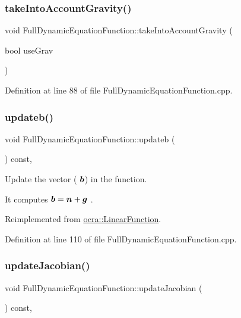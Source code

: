 \subsubsection{\texorpdfstring{take\+Into\+Account\+Gravity()}{takeIntoAccountGravity()}}
{\footnotesize\ttfamily void Full\+Dynamic\+Equation\+Function\+::take\+Into\+Account\+Gravity (\begin{DoxyParamCaption}\item[{bool}]{use\+Grav }\end{DoxyParamCaption})}



Definition at line 88 of file Full\+Dynamic\+Equation\+Function.\+cpp.

\hypertarget{group__constraint_gafab74164b55cd66d2b132915774b59f0}{}\label{group__constraint_gafab74164b55cd66d2b132915774b59f0} 
\subsubsection{\texorpdfstring{updateb()}{updateb()}}
{\footnotesize\ttfamily void Full\+Dynamic\+Equation\+Function\+::updateb (\begin{DoxyParamCaption}{ }\end{DoxyParamCaption}) const\hspace{0.3cm}{\ttfamily [protected]}, {\ttfamily [virtual]}}

Update the vector ( $ \mbox{\boldmath${b}$} $) in the function.

It computes $ \mbox{\boldmath${b}$} = \mbox{\boldmath${n}$} + \mbox{\boldmath${g}$} $ . 

Reimplemented from \hyperlink{classocra_1_1LinearFunction_a546454cd8d0909f99433ffc0e700c9e3}{ocra\+::\+Linear\+Function}.



Definition at line 110 of file Full\+Dynamic\+Equation\+Function.\+cpp.

\hypertarget{group__constraint_ga5b4ea2e9706cd848923c835e2df0eff5}{}\label{group__constraint_ga5b4ea2e9706cd848923c835e2df0eff5} 
\subsubsection{\texorpdfstring{update\+Jacobian()}{updateJacobian()}}
{\footnotesize\ttfamily void Full\+Dynamic\+Equation\+Function\+::update\+Jacobian (\begin{DoxyParamCaption}{ }\end{DoxyParamCaption}) const\hspace{0.3cm}{\ttfamily [protected]}, {\ttfamily [virtual]}}

